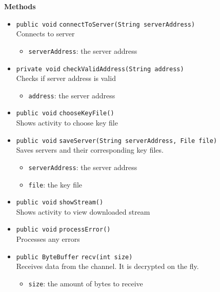 \textbf{Methods}
\begin{itemize}
\item \lstinline|public void| \lstinline|connectToServer|\lstinline|(String serverAddress)|\\
Connects to server
\begin{itemize}
\item \lstinline|serverAddress|: the server address
\end{itemize}



\item \lstinline|private void| \lstinline|checkValidAddress|\lstinline|(String address)|\\
Checks if server address is valid
\begin{itemize}
\item \lstinline|address|: the server address
\end{itemize}



\item \lstinline|public void| \lstinline|chooseKeyFile|\lstinline|()|\\
Shows activity to choose key file



\item \lstinline|public void| \lstinline|saveServer|\lstinline|(String serverAddress, File file)|\\
Saves servers and their corresponding key files.
\begin{itemize}
\item \lstinline|serverAddress|: the server address
\item \lstinline|file|: the key file
\end{itemize}



\item \lstinline|public void| \lstinline|showStream|\lstinline|()|\\
Shows activity to view downloaded stream



\item \lstinline|public void| \lstinline|processError|\lstinline|()|\\
Processes any errors



\item \lstinline|public ByteBuffer| \lstinline|recv|\lstinline|(int size)|\\
Receives data from the channel. It is decrypted on the fly.
\begin{itemize}
\item \lstinline|size|: the amount of bytes to receive
\end{itemize}



\end{itemize}

